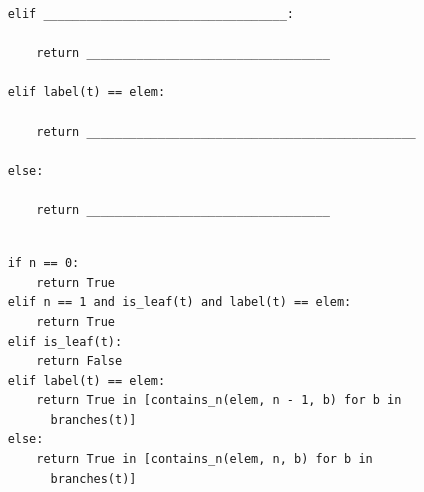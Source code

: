 \documentclass{exam}
\begin{document}
\begin{questions}
\begin{lstlisting}
    elif __________________________________:
    
        return __________________________________
        
    elif label(t) == elem:
    
        return ______________________________________________
        
    else:
    
        return __________________________________
        
\end{lstlisting}

\begin{solution}
\begin{lstlisting}
    if n == 0:
        return True
    elif n == 1 and is_leaf(t) and label(t) == elem:
        return True
    elif is_leaf(t):
        return False
    elif label(t) == elem:
        return True in [contains_n(elem, n - 1, b) for b in     
          branches(t)]
    else:
        return True in [contains_n(elem, n, b) for b in 
          branches(t)]
\end{lstlisting}
\end{solution}
\end{questions}
\end{document}

